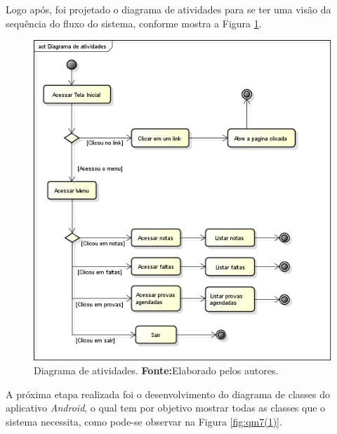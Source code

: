 	\par Logo após, foi projetado o diagrama de atividades para se ter uma visão
da sequência do fluxo do sistema, conforme mostra a Figura \ref{fig:qm3}.
		
		
		\begin{figure}[h!]
			\centerline{\includegraphics[scale=0.4]{./imagens/2_q_metodologico/qm3.png}}
			\caption[Diagrama de atividades]{Diagrama de atividades.
			 \textbf{Fonte:}Elaborado pelos autores.}
			\label{fig:qm3}
		\end{figure}
		
		\par A próxima etapa realizada foi o desenvolvimento do diagrama de classes do
aplicativo \textit{Android}, o qual tem por objetivo mostrar todas as classes
que o sistema necessita, como pode-se observar na Figura \ref{fig:qm7(1)}.
		
